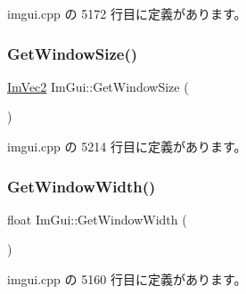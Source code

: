  imgui.\+cpp の 5172 行目に定義があります。

\mbox{\label{namespace_im_gui_aaa5c0bfac7125ba9850a08b6db2e90c9}} 
\subsubsection{\texorpdfstring{Get\+Window\+Size()}{GetWindowSize()}}
{\footnotesize\ttfamily \mbox{\hyperlink{struct_im_vec2}{Im\+Vec2}} Im\+Gui\+::\+Get\+Window\+Size (\begin{DoxyParamCaption}{ }\end{DoxyParamCaption})}



 imgui.\+cpp の 5214 行目に定義があります。

\mbox{\label{namespace_im_gui_a471ff23945b99541c506dbdc2a9004cf}} 
\subsubsection{\texorpdfstring{Get\+Window\+Width()}{GetWindowWidth()}}
{\footnotesize\ttfamily float Im\+Gui\+::\+Get\+Window\+Width (\begin{DoxyParamCaption}{ }\end{DoxyParamCaption})}



 imgui.\+cpp の 5160 行目に定義があります。

\mbox{\label{namespace_im_gui_ad8705ac3b718c1b2e84e7b8c34f90249}} 
